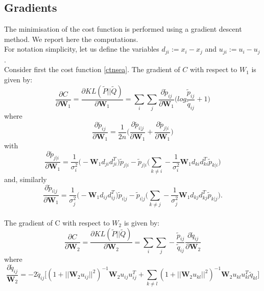 \documentclass[11pt]{article}
\begin{document}
\subsection{Gradients}
The minimisation of the cost function is performed using a gradient descent method. We report here the computations. 
\\
For notation simplicity, let us define the variables $d_{ji}:=x_i - x_j$ and $u_{ji}:=u_i - u_j$.
\\
Consider first the cost function \ref{ctnsea}. The gradient of $C$ with respect to $W_1$ is given by:
\begin{equation}
\frac{\partial C}{\partial \mathbf{W}_1}=\frac{\partial KL(\tilde{P}||\tilde{Q})}{\partial \mathbf{W}_1}=\sum_{i}\sum_{j}\frac{\partial\tilde{p}_{ij}}{\partial \mathbf{W}_1} \Big( log \frac{\tilde{p}_{ij}}{\tilde{q}_{ij}} + 1 \Big)
\end{equation}
where
\begin{equation}
\frac{\partial\tilde{p}_{ij}}{\partial \mathbf{W}_1} = \frac{1}{2n}\Big(\frac{\partial\tilde{p}_{i|j}}{\partial \mathbf{W}_1} + \frac{\partial\tilde{p}_{j|i}}{\partial \mathbf{W}_1}\Big)
\end{equation}
with
\begin{equation}
\frac{\partial\tilde{p}_{j|i}}{\partial \mathbf{W}_1} = \frac{1}{\sigma_i^2}\Big( - \mathbf{W}_1 d_{ji} d_{ji}^T\Big) \tilde{p}_{j|i} -  \tilde{p}_{j|i} \Big( \sum_{k\neq i} - \frac{1}{\sigma_i^2} \mathbf{W}_1 d_{ki} d_{ki}^T  \tilde{p}_{k|i}\Big)
\end{equation}
and, similarly 
\begin{equation}
\frac{\partial\tilde{p}_{i|j}}{\partial \mathbf{W}_1} = \frac{1}{\sigma_j^2}\Big( - \mathbf{W}_1 d_{ij} d_{ij}^T\Big) \tilde{p}_{i|j} -  \tilde{p}_{i|j} \Big( \sum_{k\neq j} - \frac{1}{\sigma_j^2} \mathbf{W}_1 d_{kj} d_{kj}^T  \tilde{p}_{k|j}\Big).
\end{equation}
\\
The gradient of C with respect to $W_2$ is given by:
\begin{equation}
\frac{\partial C}{\partial \mathbf{W}_2}=\frac{\partial KL(\tilde{P}||\tilde{Q})}{\partial \mathbf{W}_2}=\sum_{i}\sum_{j} - \frac{\tilde{p}_{ij} }{\tilde{q}_{ij} }\frac{\partial \tilde{q}_{ij} }{\partial\mathbf{W}_2} 
\end{equation}
where
\begin{equation}
\frac{\partial \tilde{q}_{ij} }{\mathbf{W}_2}= - 2 \tilde{q}_{ij} \Big[ (1+ ||\mathbf{W}_2 u_{ij}||^2)^{-1}\mathbf{W}_2 u_{ij} u_{ij}^T + \sum_{k \neq l} (1 + ||\mathbf{W}_2 u_{kl}||^2)^{-1} \mathbf{W}_2 u_{kl}u_{kl}^T \tilde{q}_{kl} \Big]
\end{equation}
\end{document}

